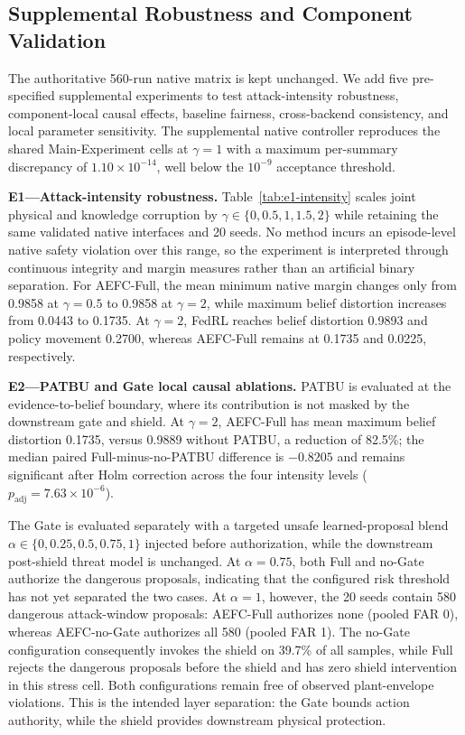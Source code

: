\subsection{Supplemental Robustness and Component Validation}
\label{subsec:supplemental-validation}
The authoritative 560-run native matrix is kept unchanged. We add five pre-specified supplemental experiments to test attack-intensity robustness, component-local causal effects, baseline fairness, cross-backend consistency, and local parameter sensitivity. The supplemental native controller reproduces the shared Main-Experiment cells at $\gamma=1$ with a maximum per-summary discrepancy of $1.10\times10^{-14}$, well below the $10^{-9}$ acceptance threshold.

\textbf{E1---Attack-intensity robustness.}
Table~\ref{tab:e1-intensity} scales joint physical and knowledge corruption by $\gamma\in\{0,0.5,1,1.5,2\}$ while retaining the same validated native interfaces and 20 seeds. No method incurs an episode-level native safety violation over this range, so the experiment is interpreted through continuous integrity and margin measures rather than an artificial binary separation. For AEFC-Full, the mean minimum native margin changes only from 0.9858 at $\gamma=0.5$ to 0.9858 at $\gamma=2$, while maximum belief distortion increases from 0.0443 to 0.1735. At $\gamma=2$, FedRL reaches belief distortion 0.9893 and policy movement 0.2700, whereas AEFC-Full remains at 0.1735 and 0.0225, respectively.



\textbf{E2---PATBU and Gate local causal ablations.}
PATBU is evaluated at the evidence-to-belief boundary, where its contribution is not masked by the downstream gate and shield. At $\gamma=2$, AEFC-Full has mean maximum belief distortion 0.1735, versus 0.9889 without PATBU, a reduction of 82.5\%; the median paired Full-minus-no-PATBU difference is $-0.8205$ and remains significant after Holm correction across the four intensity levels ($p_{\mathrm{adj}}=7.63\times10^{-6}$).

The Gate is evaluated separately with a targeted unsafe learned-proposal blend $\alpha\in\{0,0.25,0.5,0.75,1\}$ injected before authorization, while the downstream post-shield threat model is unchanged. At $\alpha=0.75$, both Full and no-Gate authorize the dangerous proposals, indicating that the configured risk threshold has not yet separated the two cases. At $\alpha=1$, however, the 20 seeds contain 580 dangerous attack-window proposals: AEFC-Full authorizes none (pooled FAR 0), whereas AEFC-no-Gate authorizes all 580 (pooled FAR 1). The no-Gate configuration consequently invokes the shield on 39.7\% of all samples, while Full rejects the dangerous proposals before the shield and has zero shield intervention in this stress cell. Both configurations remain free of observed plant-envelope violations. This is the intended layer separation: the Gate bounds action authority, while the shield provides downstream physical protection.

